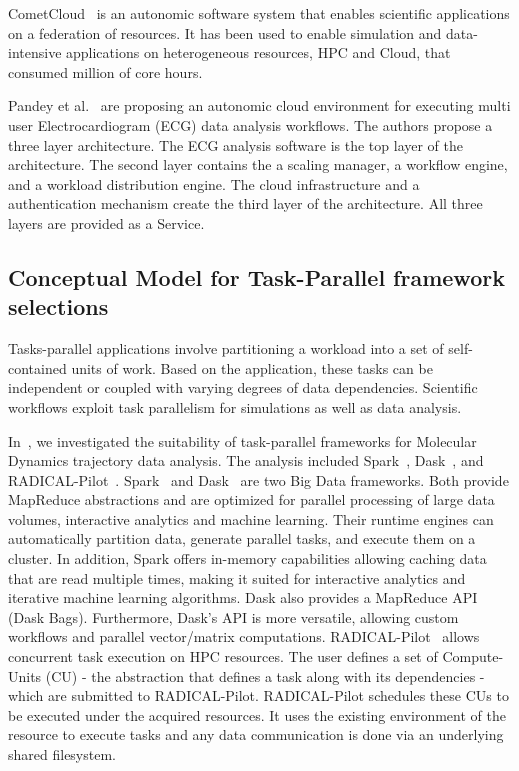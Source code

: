 CometCloud~\cite{diazmontes2015cometcloud} is an autonomic software system that 
enables scientific applications on a federation of resources. It has been used 
to enable simulation and data-intensive applications on heterogeneous resources, 
HPC and Cloud, that consumed million of core hours.

Pandey et al.~\cite{pandey2012autonomic} are proposing an autonomic cloud 
environment for executing multi user Electrocardiogram (ECG) data analysis 
workflows. The authors propose a three layer architecture. The ECG analysis 
software is the top layer of the architecture. The second layer contains the a 
scaling manager, a workflow engine, and a workload distribution engine. The cloud 
infrastructure and a authentication mechanism create the third layer of the 
architecture. All three layers are provided as a Service.  

\subsection{Conceptual Model for Task-Parallel framework selections}
Tasks-parallel applications involve partitioning a workload into a set of 
self-contained units of work. Based on the application, these tasks can be 
independent or coupled with varying degrees of data dependencies. Scientific 
workflows exploit task parallelism for simulations as well as data analysis.

In~\cite{paraskevakos2018task}, we investigated the suitability of task-parallel 
frameworks for Molecular Dynamics trajectory data analysis. The analysis included 
Spark~\cite{zaharia2010spark}, Dask~\cite{rocklin2015dask}, and RADICAL-Pilot~\cite{merzky2019using}. 
Spark~\cite{zaharia2010spark} and Dask~\cite{rocklin2015dask} are two Big Data 
frameworks. Both provide MapReduce abstractions and are optimized for parallel 
processing of large data volumes, interactive analytics and machine learning. Their 
runtime engines can automatically partition data, generate parallel tasks, and 
execute them on a cluster. In addition, Spark offers in-memory capabilities allowing 
caching data that are read multiple times, making it suited for interactive 
analytics and iterative machine learning algorithms. Dask also provides a MapReduce 
API (Dask Bags). Furthermore, Dask’s API is more versatile, allowing custom 
workflows and parallel vector/matrix computations. RADICAL-Pilot~\cite{merzky2019using} 
allows concurrent task execution on HPC resources. The user defines a set of 
Compute-Units (CU) - the abstraction that defines a task along with its dependencies - 
which are submitted to RADICAL-Pilot. RADICAL-Pilot schedules these CUs to be 
executed under the acquired resources. It uses the existing environment of the 
resource to execute tasks and any data communication is done via an underlying 
shared filesystem.

